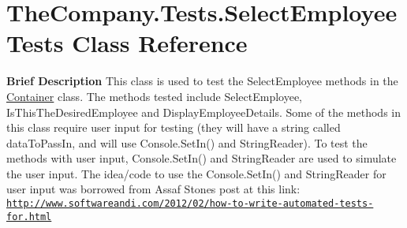\hypertarget{class_the_company_1_1_tests_1_1_select_employee_tests}{}\section{The\+Company.\+Tests.\+Select\+Employee\+Tests Class Reference}
\label{class_the_company_1_1_tests_1_1_select_employee_tests}


{\bfseries  Brief Description} This class is used to test the Select\+Employee methods in the \hyperlink{class_the_company_1_1_container}{Container} class. The methods tested include Select\+Employee, Is\+This\+The\+Desired\+Employee and Display\+Employee\+Details. Some of the methods in this class require user input for testing (they will have a string called data\+To\+Pass\+In, and will use Console.\+Set\+In() and String\+Reader). To test the methods with user input, Console.\+Set\+In() and String\+Reader are used to simulate the user input. The idea/code to use the Console.\+Set\+In() and String\+Reader for user input was borrowed from Assaf Stone\textquotesingle{}s post at this link\+: \href{http://www.softwareandi.com/2012/02/how-to-write-automated-tests-for.html}{\tt http\+://www.\+softwareandi.\+com/2012/02/how-\/to-\/write-\/automated-\/tests-\/for.\+html}  


